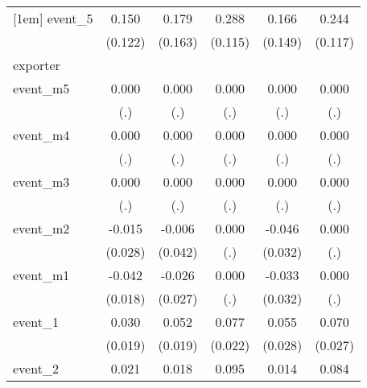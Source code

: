 {\begin{tabular}{l*{5}{c}}
[1em]
event\_5     &       0.150         &       0.179         &       0.288\sym{*}  &       0.166         &       0.244\sym{*}  \\
            &     (0.122)         &     (0.163)         &     (0.115)         &     (0.149)         &     (0.117)         \\
\hline
exporter    &                     &                     &                     &                     &                     \\
event\_m5    &       0.000         &       0.000         &       0.000         &       0.000         &       0.000         \\
            &         (.)         &         (.)         &         (.)         &         (.)         &         (.)         \\
[1em]
event\_m4    &       0.000         &       0.000         &       0.000         &       0.000         &       0.000         \\
            &         (.)         &         (.)         &         (.)         &         (.)         &         (.)         \\
[1em]
event\_m3    &       0.000         &       0.000         &       0.000         &       0.000         &       0.000         \\
            &         (.)         &         (.)         &         (.)         &         (.)         &         (.)         \\
[1em]
event\_m2    &      -0.015         &      -0.006         &       0.000         &      -0.046         &       0.000         \\
            &     (0.028)         &     (0.042)         &         (.)         &     (0.032)         &         (.)         \\
[1em]
event\_m1    &      -0.042\sym{*}  &      -0.026         &       0.000         &      -0.033         &       0.000         \\
            &     (0.018)         &     (0.027)         &         (.)         &     (0.032)         &         (.)         \\
[1em]
event\_1     &       0.030         &       0.052\sym{**} &       0.077\sym{***}&       0.055         &       0.070\sym{*}  \\
            &     (0.019)         &     (0.019)         &     (0.022)         &     (0.028)         &     (0.027)         \\
[1em]
event\_2     &       0.021         &       0.018         &       0.095\sym{***}&       0.014         &       0.084\sym{**} \\

\end{tabular}}
